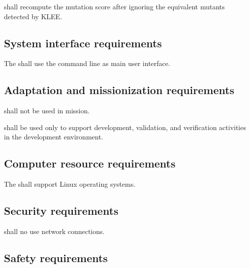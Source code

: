 \RQ{} \FAQAS shall recompute the mutation score after ignoring the equivalent mutants detected by KLEE.


\subsection{System interface requirements}

\RQ{} The \FAQAS shall use the command line as main user interface.


\subsection{Adaptation and missionization requirements }

\RQ{} \FAQAS shall not be used in mission.

\RQ{} \FAQAS shall be used only to support development, validation, and verification activities in the development environment. 


\subsection{Computer resource requirements}

\RQ{} The \FAQAS shall support Linux operating systems.

\subsection{Security requirements }

\RQ{} \FAQAS shall no use network connections.

\subsection{Safety requirements}

